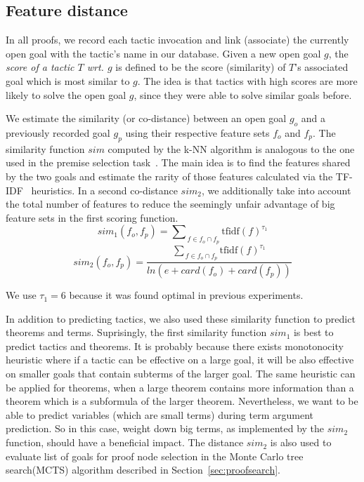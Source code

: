 \documentclass[runningheads,a4paper,draft]{svjour3}
\begin{document}
\subsection{Feature distance}\label{sec:predictions}

In all proofs, we record each tactic invocation and link (associate) the 
currently open goal with the tactic's name in our database.
Given a new open goal $g$, the \emph{score of a tactic $T$ wrt. $g$} is defined 
to be the score (similarity) of $T$'s 
associated goal which is most similar to $g$.
The idea is that tactics with high scores are more likely to solve the open 
goal $g$, 
since they were able to solve similar goals before.

We estimate the similarity (or co-distance) between an open goal $g_o$ and a 
previously recorded goal $g_p$ using their respective feature sets $f_o$ and 
$f_p$.
The similarity function $sim$ computed by the k-NN algorithm is analogous 
to the
one used in the premise selection task~\cite{ckju-pxtp13}. The main idea 
is to find the features shared by the two goals and estimate the rarity of 
those features calculated via the TF-IDF~\cite{Jones72astatistical} heuristics.
In a second co-distance $sim_2$, we additionally take into account 
the
total number of 
features to reduce the seemingly unfair advantage of big feature sets in the 
first scoring function.
\[sim_1 (f_o, f_p) = {\sum\nolimits_{\,f \in f_o \cap 
f_p}{\text{tfidf}(f)^{\tau_1}}}\]
\[sim_2 (f_o, f_p) = \frac{{\sum\nolimits_{\,f \in f_o \cap 
f_p}{\text{tfidf}(f)^{\tau_1}}}}
{ln (e + card(f_o) + card(f_p))}
\]

\begin{remark}
We use $\tau_1 = 6$ because it was found optimal in previous experiments.
\end{remark}



In addition to predicting tactics, we also used these similarity function to 
predict theorems and terms. Suprisingly, the first similarity function $sim_1$
is best to predict tactics and theorems. It is probably because there exists 
monotonocity heuristic where if a tactic can be effective on a large goal, it 
will be also effective on smaller goals that contain subterms of the larger 
goal. The same heuristic can be applied for theorems, when a large theorem 
contains more information than a theorem which is a subformula of the larger 
theorem. Nevertheless, we want to be able to predict variables (which are small 
terms) during term argument prediction. So in this case, weight down big terms, 
as implemented by the $sim_2$ function, should have a beneficial impact.
The distance $sim_2$ is also used to evaluate list of goals for proof node 
selection in the Monte Carlo tree search(MCTS) algorithm described in 
Section~\ref{sec:proofsearch}.
\end{document}
